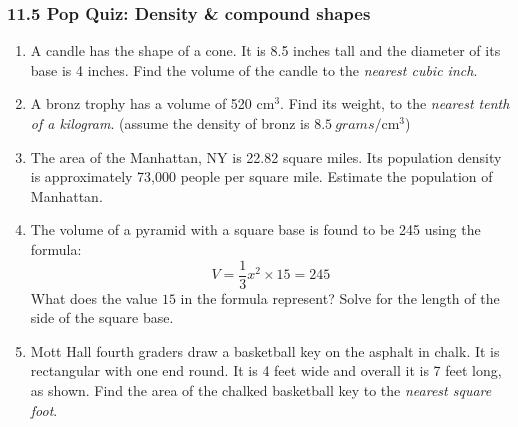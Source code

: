\documentclass[12pt, twoside]{article}
\begin{document}
\subsubsection*{11.5 Pop Quiz: Density \& compound shapes}
 \begin{enumerate}

\item A candle has the shape of a cone. It is 8.5 inches tall and the diameter of its base is 4 inches. Find the volume of the candle to the \emph{nearest cubic inch}. \vspace{3cm}

\item A bronz trophy has a volume of 520 cm$^3$. Find its weight, to the \emph{nearest tenth of a kilogram}. (assume the density of bronz is $8.5 \ grams/ \mathrm{cm}^3$) \vspace{2.5cm}

\item The area of the Manhattan, NY is 22.82 square miles. Its population density is approximately 73,000 people per square mile. Estimate the population of Manhattan. \vspace{2.5cm}

\item The volume of a pyramid with a square base is found to be 245 using the formula:
  \[V=\frac{1}{3} x^2 \times 15=245\]
  What does the value $15$ in the formula represent? Solve for the length of the side of the square base. \vspace{7cm}

\newpage
\item Mott Hall fourth graders draw a basketball key on the asphalt in chalk. It is rectangular with one end round. It is 4 feet wide and overall it is 7 feet long, as shown. Find the area of the chalked basketball key to the \emph{nearest square foot}.\\[1.5cm]


\end{enumerate}
\end{document}
